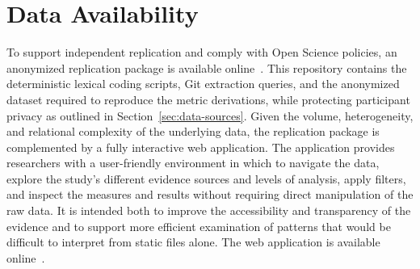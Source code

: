 \section{Data Availability}
To support independent replication and comply with Open Science policies, an
anonymized replication package is available online~\cite{prism_replication_package}.
This repository contains the deterministic lexical coding scripts, Git
extraction queries, and the anonymized dataset required to reproduce the metric
derivations, while protecting participant privacy as outlined in
Section~\ref{sec:data-sources}. Given the volume, heterogeneity, and relational
complexity of the underlying data, the replication package is complemented by a
fully interactive web application. The application provides researchers with a
user-friendly environment in which to navigate the data, explore the study's
different evidence sources and levels of analysis, apply filters, and inspect
the measures and results without requiring direct manipulation of the raw data.
It is intended both to improve the accessibility and transparency of the
evidence and to support more efficient examination of patterns that would be
difficult to interpret from static files alone. The web application is
available online~\cite{prism_explorer}.
